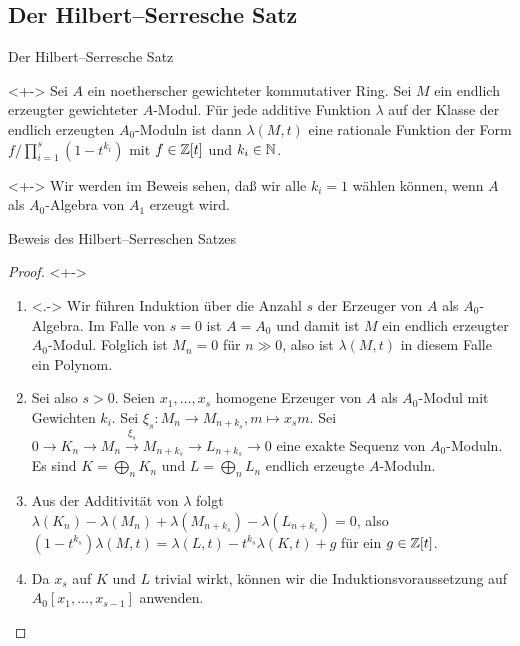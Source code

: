 \subsection{Der Hilbert--Serresche Satz}

\begin{frame}{Der Hilbert--Serresche Satz}
	\begin{theorem}<+->
		\label{thm:hilbert_serre}
		Sei \(A\) ein noetherscher gewichteter kommutativer Ring. Sei \(M\)
		ein endlich erzeugter gewichteter \(A\)-Modul. Für jede additive Funktion
		\(\lambda\) auf der Klasse der endlich erzeugten \(A_0\)-Moduln ist dann
		\(\lambda(M, t)\) eine rationale Funktion der Form
		\(f/\prod\limits_{i = 1}^s (1 - t^{k_i})\) mit \(f \in \mathbb Z[t]\) und
		\(k_i \in \mathbb N\).
	\end{theorem}
	\begin{remark}<+->
		Wir werden im Beweis sehen, daß wir alle \(k_i = 1\) wählen können,
		wenn \(A\) als \(A_0\)-Algebra von \(A_1\) erzeugt wird.
	\end{remark}
\end{frame}

\begin{frame}{Beweis des Hilbert--Serreschen Satzes}
	\begin{proof}<+->
		\begin{enumerate}[<+->]
		\item<.->
			Wir führen Induktion über die Anzahl \(s\) der Erzeuger von \(A\)
			als \(A_0\)-Algebra. Im Falle von \(s = 0\) ist \(A = A_0\) und damit
			ist \(M\) ein endlich erzeugter \(A_0\)-Modul. Folglich ist
			\(M_n = 0\) für \(n \gg 0\), also ist \(\lambda(M, t)\) in diesem
			Falle ein Polynom.
		\item
			Sei also \(s > 0\). Seien \(x_1, \dotsc, x_s\) homogene
			Erzeuger von \(A\) als \(A_0\)-Modul mit Gewichten \(k_i\). Sei
			\(\xi_s\colon M_n \to M_{n + k_s}, m \mapsto x_s m\).
			Sei \(0 \to K_n \to M_n \xrightarrow{\xi_s} M_{n + k_s} \to L_{n + k_s}
			\to 0\) eine exakte Sequenz von \(A_0\)-Moduln. Es sind \(K = \bigoplus\limits_n K_n\)
			und \(L = \bigoplus\limits_n L_n\) endlich erzeugte \(A\)-Moduln.
		\item
			Aus der Additivität von \(\lambda\) folgt
			\(\lambda(K_n) - \lambda(M_n) + \lambda(M_{n + k_s}) -
			\lambda(L_{n + k_s}) = 0\), also
			\((1 - t^{k_s}) \lambda(M, t) = \lambda(L, t) -
			t^{k_s} \lambda(K, t) + g\) für ein \(g \in \mathbb Z[t]\).
		\item
			Da \(x_s\) auf \(K\) und \(L\) trivial wirkt, können wir die
			Induktionsvoraussetzung auf \(A_0[x_1, \dotsc, x_{s - 1}]\) anwenden.
			\qedhere
		\end{enumerate}
	\end{proof}
\end{frame}

